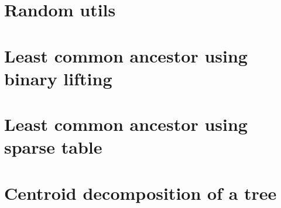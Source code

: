 \section{Random utils}
\raggedbottom

\section{Least common ancestor using binary lifting}
\raggedbottom

\section{Least common ancestor using sparse table}
\raggedbottom

\section{Centroid decomposition of a tree}
\raggedbottom